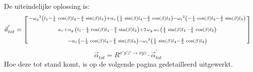 De uiteindelijke oplossing is:
\begin{equation}
\vec{a}_{tot}^{'}=\left[ \begin {smallmatrix} -{\omega_{g}}^{2} \left( l_{1}-\frac{1}{4}\,\cos \left( \beta \right) l_{4}-\frac{3}{4}\,\sin \left( \beta \right) l_{3} \right) +\alpha_{i}\, \left( \frac{1}{4}\,\sin \left( \beta \right) l_{4}-\frac{3}{4}\,\cos \left( \beta \right) l_{3} \right) -{\omega_{i}}^{2} \left( -\frac{1}{4}\,\cos \left( \beta \right) l_{4}-\frac{3}{4}\,\sin \left( \beta \right) l_{3} \right) \\ \noalign{\medskip}a_{v}+\alpha_{g}\, \left( l_{1}-\frac{1}{4}\,\cos \left( \beta \right) l_{4}-\frac{3}{4}\,\sin \left( \beta \right) l_{3} \right) +3\,\omega_{g}\,\omega_{i}\, \left( \frac{1}{4}\,\sin \left( \beta \right) l_{4}-\frac{3}{4}\,\cos \left( \beta \right) l_{3} \right) \\ \noalign{\medskip}-\alpha_{i}\, \left( -\frac{1}{4}\,\cos \left( \beta \right) l_{4}-\frac{3}{4}\,\sin \left( \beta \right) l_{3} \right) -{\omega_{i}}^{2} \left( \frac{1}{4}\,\sin \left( \beta \right) l_{4}-\frac{3}{4}\,\cos \left(\beta \right) l_{3} \right) \end {smallmatrix} \right]
\label{eq:kin4.12}
\end{equation}
\begin{equation}
\vec{\alpha}_{tot}=R^{x'y'z' \rightarrow xyz}\cdot\vec{\alpha}_{tot}^{'}
\end{equation}
Hoe deze tot stand komt, is op de volgende pagina gedetailleerd uitgewerkt.
\newpage
